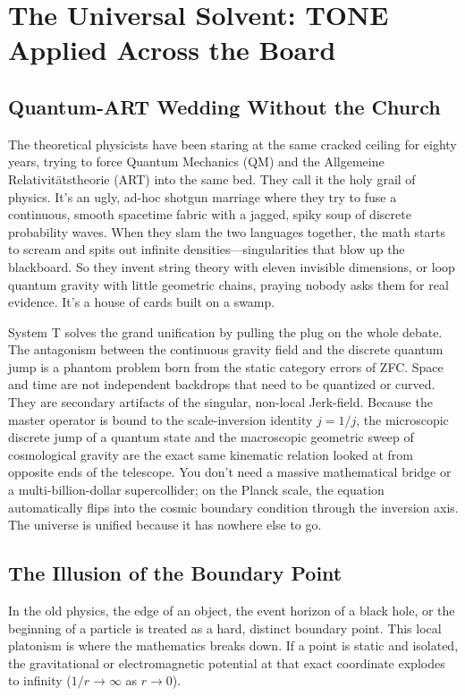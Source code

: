 \documentclass[11pt,a4paper]{article}
\begin{document}
\section{The Universal Solvent: TONE Applied Across the Board}

\subsection{Quantum-ART Wedding Without the Church}
The theoretical physicists have been staring at the same cracked ceiling for eighty years, trying to force Quantum Mechanics (QM) and the Allgemeine Relativitätstheorie (ART) into the same bed. They call it the holy grail of physics. It’s an ugly, ad-hoc shotgun marriage where they try to fuse a continuous, smooth spacetime fabric with a jagged, spiky soup of discrete probability waves. When they slam the two languages together, the math starts to scream and spits out infinite densities—singularities that blow up the blackboard. So they invent string theory with eleven invisible dimensions, or loop quantum gravity with little geometric chains, praying nobody asks them for real evidence. It's a house of cards built on a swamp.

System T solves the grand unification by pulling the plug on the whole debate. The antagonism between the continuous gravity field and the discrete quantum jump is a phantom problem born from the static category errors of ZFC. Space and time are not independent backdrops that need to be quantized or curved. They are secondary artifacts of the singular, non-local Jerk-field. Because the master operator is bound to the scale-inversion identity $j = 1/j$, the microscopic discrete jump of a quantum state and the macroscopic geometric sweep of cosmological gravity are the exact same kinematic relation looked at from opposite ends of the telescope. You don't need a massive mathematical bridge or a multi-billion-dollar supercollider; on the Planck scale, the equation automatically flips into the cosmic boundary condition through the inversion axis. The universe is unified because it has nowhere else to go.

\subsection{The Illusion of the Boundary Point}
In the old physics, the edge of an object, the event horizon of a black hole, or the beginning of a particle is treated as a hard, distinct boundary point. This local platonism is where the mathematics breaks down. If a point is static and isolated, the gravitational or electromagnetic potential at that exact coordinate explodes to infinity ($1/r \to \infty$ as $r \to 0$). 
\end{document}
